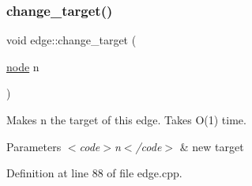 \subsubsection{\texorpdfstring{change\+\_\+target()}{change\_target()}}
{\footnotesize\ttfamily void edge\+::change\+\_\+target (\begin{DoxyParamCaption}\item[{\mbox{\hyperlink{classnode}{node}}}]{n }\end{DoxyParamCaption})}

Makes {\ttfamily n} the target of this edge. Takes O(1) time.


\begin{DoxyParams}{Parameters}
{\em $<$code$>$n$<$/code$>$} & new target \\
\hline
\end{DoxyParams}


Definition at line 88 of file edge.\+cpp.


